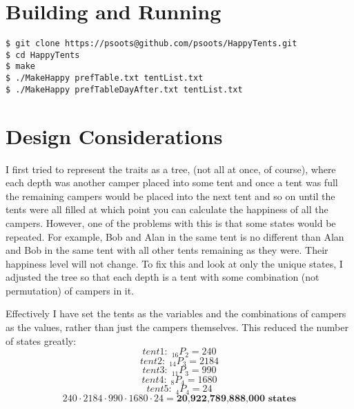 \documentclass{article}
\begin{document}
\section{Building and Running}
\texttt{\$ git clone https://psoots@github.com/psoots/HappyTents.git \\
\$ cd HappyTents \\
\$ make \\
\$ ./MakeHappy prefTable.txt tentList.txt \\
\$ ./MakeHappy prefTableDayAfter.txt tentList.txt} 

\section{Design Considerations}

I first tried to represent the traits as a tree, (not all at once, of course), where each depth was another camper placed into some tent and once a tent was full the remaining campers would be placed into the next tent and so on until the tents were all filled at which point you can calculate the happiness of all the campers. However, one of the problems with this is that some states would be repeated. For example, Bob and Alan in the same tent is no different than Alan and Bob in the same tent with all other tents remaining as they were. Their happiness level will not change. To fix this and look at only the unique states, I adjusted the tree so that each depth is a tent with some combination (not permutation) of campers in it. 

Effectively I have set the tents as the variables and the combinations of campers as the values, rather than just the campers themselves. This reduced the number of states greatly: 
\begin{displaymath} tent 1:\; _{16}P_{2} = 240 \end{displaymath}
\begin{displaymath} tent 2:\; _{14}P_{3} = 2184 \end{displaymath}
\begin{displaymath} tent 3:\; _{11}P_{3} = 990 \end{displaymath}
\begin{displaymath} tent 4:\; _{8}P_{4} = 1680 \end{displaymath}
\begin{displaymath} tent 5:\; _{4}P_{4} = 24 \end{displaymath}
\begin{displaymath} 240 \cdot 2184\cdot 990\cdot 1680\cdot 24 = \textbf{20,922,789,888,000 states} \end{displaymath}
\end{document}
